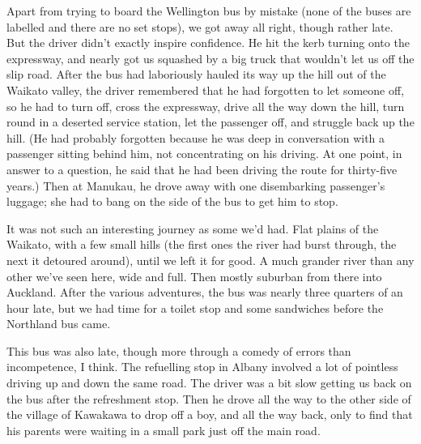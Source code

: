 \documentclass[12pt,a4paper]{article}
\begin{document}
Apart from trying to board the Wellington bus by mistake (none of the buses
are labelled and there are no set stops), we got away all right, though
rather late. But the driver didn't exactly inspire confidence. He hit the
kerb turning onto the expressway, and nearly got us squashed by a big truck
that wouldn't let us off the slip road. After the bus had laboriously hauled
its way up the hill out of the Waikato valley, the driver remembered that he
had forgotten to let someone off, so he had to turn off, cross the
expressway, drive all the way down the hill, turn round in a deserted service
station, let the passenger off, and struggle back up the hill. (He had
probably forgotten because he was deep in conversation with a passenger
sitting behind him, not concentrating on his driving. At one point, in
answer to a question, he said that he had been driving the route for
thirty-five years.) Then at Manukau, he drove away with one disembarking
passenger's luggage; she had to bang on the side of the bus to get him to stop.

It was not such an interesting journey as some we'd had. Flat plains of
the Waikato, with a few small hills (the first ones the river had burst 
through, the next it detoured around), until we left it for good. A much 
grander river than any other we've seen here, wide and full. Then mostly
suburban from there into Auckland. After the various adventures, the bus
was nearly three quarters of an hour late, but we had time for a toilet
stop and some sandwiches before the Northland bus came.

This bus was also late, though more through a comedy of errors than
incompetence, I think. The refuelling stop in Albany involved a lot of
pointless driving up and down the same road. The driver was a bit slow
getting us back on the bus after the refreshment stop. Then he drove all
the way to the other side of the village of Kawakawa to drop off a boy,
and all the way back, only to find that his parents were waiting in a small
park just off the main road.
\end{document}

